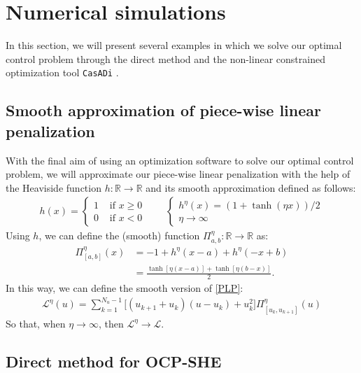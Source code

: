 \section{Numerical simulations}\label{Section5}

In this section, we will present several examples in which we solve our optimal control problem through the direct method and the non-linear constrained optimization tool \texttt{CasADi} \cite{Andersson2019}.
%
\subsection{Smooth approximation of piece-wise linear penalization}

With the final aim of using an optimization software to solve our optimal control problem, we will approximate our piece-wise linear penalization with the help of the Heaviside function $h:\mathbb{R} \rightarrow \mathbb{R}$ and its smooth approximation defined as follows: 
\begin{gather}
    h(x) = \begin{cases}
        1 & \text{ if } x \geq 0 \\
        0 & \text{ if } x < 0
    \end{cases}    
    \hspace{2em} 
    \begin{cases}
        h^\eta(x) = (1 + \tanh(\eta x))/2   \\
        \eta \rightarrow \infty
    \end{cases}
\end{gather}
Using $h$, we can define the (smooth) function $\Pi_{a,b}^\eta:\mathbb{R} \rightarrow \mathbb{R}$ as:
\begin{align*}
    \Pi_{[a,b]}^\eta(x) &= - 1 + h^\eta(x-a) + h^\eta(-x+b) 
    \\
    &= \frac{\tanh[\eta( x -a)] + \tanh[\eta (b-x)]}{2}.
\end{align*}
In this way, we can define the smooth version of \eqref{PLP}:
\begin{gather}
    \mathcal{L}^\eta(u) = \sum_{k = 1}^{N_u-1} \big[ (u_{k+1}+u_{k}) (u-u_k) + u_k^2 \big] \Pi^\eta_{[u_k,u_{k+1}]}(u)
\end{gather}
So that, when $\eta \rightarrow \infty$, then $\mathcal{L}^\eta \rightarrow \mathcal{L}$.

\subsection{Direct method  for  OCP-SHE}

